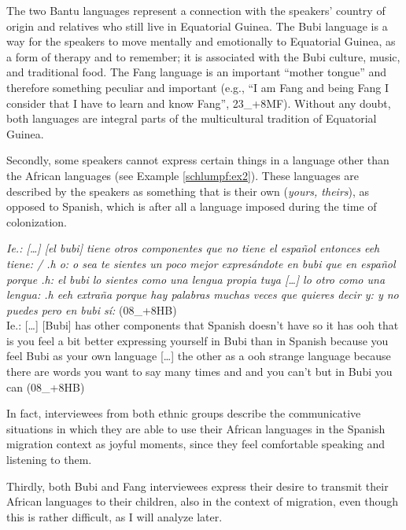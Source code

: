 \documentclass[output=paper]{langscibook}
\begin{document}
The two Bantu languages represent a connection with the speakers’ country of origin and relatives who still live in Equatorial Guinea. The Bubi language is a way for the speakers to move mentally and emotionally to Equatorial Guinea, as a form of therapy and to remember; it is associated with the Bubi culture, music, and traditional food. The Fang language is an important “mother tongue” and therefore something peculiar and important (e.g., “I am Fang and being Fang I consider that I have to learn and know Fang”, 23\_+8MF). Without any doubt, both languages are integral parts of the multicultural tradition of Equatorial Guinea.

Secondly, some speakers cannot express certain things in a language other than the African languages (see Example \ref{schlumpf:ex2}). These languages are described by the speakers as something that is their own (\textit{yours, theirs}), as opposed to Spanish, which is after all a language imposed during the time of colonization.

\begin{exe}\ex\label{schlumpf:ex2}
\textit{Ie.: […] [el bubi] tiene otros componentes que no tiene el español entonces eeh tiene: / .h o: o sea te sientes un poco mejor expresándote en bubi que en español porque .h: el bubi lo sientes como una lengua propia tuya […] lo otro como una lengua: .h eeh extraña porque hay palabras muchas veces que quieres decir y: y no puedes pero en bubi sí:} (08\_+8HB)\\
Ie.: […] [Bubi] has other components that Spanish doesn’t have so it has ooh that is you feel a bit better expressing yourself in Bubi than in Spanish because you feel Bubi as your own language […] the other as a ooh strange language because there are words you want to say many times and and you can’t but in Bubi you can (08\_+8HB)
\end{exe}

In fact, interviewees from both ethnic groups describe the communicative situations in which they are able to use their African languages in the Spanish migration context as joyful moments, since they feel comfortable speaking and listening to them.

Thirdly, both Bubi and Fang interviewees express their desire to transmit their African languages to their children, also in the context of migration, even though this is rather difficult, as I will analyze later.
\end{document}
